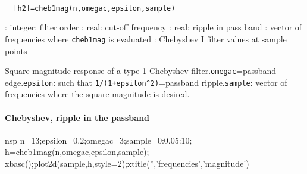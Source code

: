 
\begin{mandesc}
   \\ %
\end{mandesc}
\begin{calling_sequence}
\begin{verbatim}
  [h2]=cheb1mag(n,omegac,epsilon,sample)  
\end{verbatim}
\end{calling_sequence}
\begin{parameters}
  \begin{varlist}
    : integer: filter order
    : real: cut-off frequency
    : real: ripple in pass band
    : vector of frequencies where \verb!cheb1mag! is evaluated
    : Chebyshev I filter values at sample points
  \end{varlist}
\end{parameters}
\begin{mandescription}
  Square magnitude response of a type 1 Chebyshev filter.\verb!omegac!=passband
  edge.\verb!epsilon!: such that \verb!1/(1+epsilon^2)!=passband
  ripple.\verb!sample!: vector of frequencies where the square magnitude is
  desired.
\end{mandescription}
\begin{examples}
\paragraph{Chebyshev, ripple in the passband}
  \begin{mintednsp}{nsp}
    n=13;epsilon=0.2;omegac=3;sample=0:0.05:10;
    h=cheb1mag(n,omegac,epsilon,sample);
    xbasc();plot2d(sample,h,style=2);xtitle('','frequencies','magnitude')
  \end{mintednsp}
\end{examples}
\begin{manseealso}
\end{manseealso}
